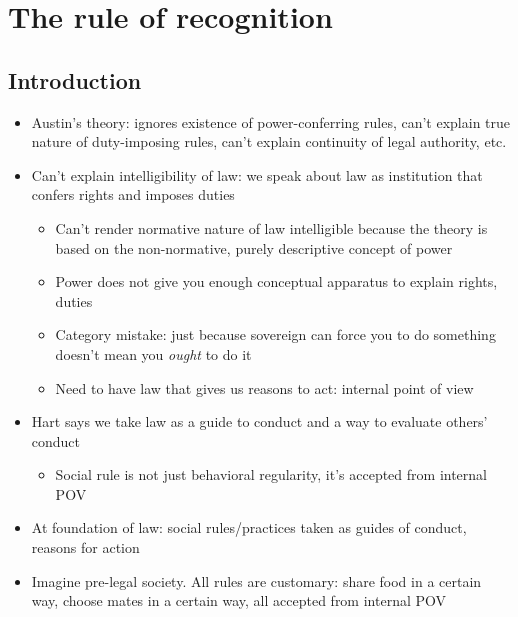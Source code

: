 \hypertarget{the-rule-of-recognition}{%
\section{The rule of recognition}\label{the-rule-of-recognition}}

\hypertarget{introduction}{%
\subsection{Introduction}\label{introduction}}

\begin{itemize}
\tightlist
\item
  Austin's theory: ignores existence of power-conferring rules, can't
  explain true nature of duty-imposing rules, can't explain continuity
  of legal authority, etc.
\item
  Can't explain intelligibility of law: we speak about law as
  institution that confers rights and imposes duties

  \begin{itemize}
  \tightlist
  \item
    Can't render normative nature of law intelligible because the theory
    is based on the non-normative, purely descriptive concept of power
  \item
    Power does not give you enough conceptual apparatus to explain
    rights, duties
  \item
    Category mistake: just because sovereign can force you to do
    something doesn't mean you \emph{ought} to do it
  \item
    Need to have law that gives us reasons to act: internal point of
    view
  \end{itemize}
\item
  Hart says we take law as a guide to conduct and a way to evaluate
  others' conduct

  \begin{itemize}
  \tightlist
  \item
    Social rule is not just behavioral regularity, it's accepted from
    internal POV
  \end{itemize}
\item
  At foundation of law: social rules/practices taken as guides of
  conduct, reasons for action
\item
  Imagine pre-legal society. All rules are customary: share food in a
  certain way, choose mates in a certain way, all accepted from internal
  POV


\end{itemize}
